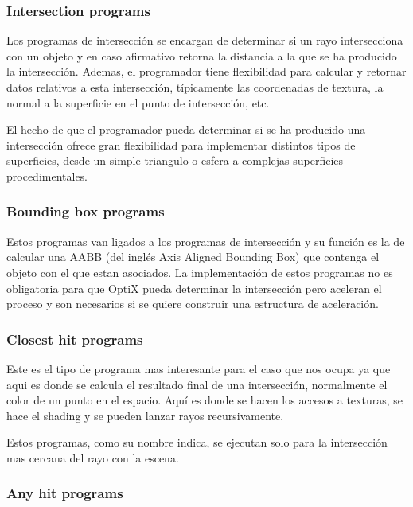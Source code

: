 \subsubsection{Intersection programs}

Los programas de intersección se encargan de determinar si un rayo intersecciona con un objeto y en caso afirmativo retorna la distancia a la que se ha producido la intersección. Ademas, el programador tiene flexibilidad para calcular y retornar datos relativos a esta intersección, típicamente las coordenadas de textura, la normal a la superficie en el punto de intersección, etc.

\medskip

El hecho de que el programador pueda determinar si se ha producido una intersección ofrece gran flexibilidad para implementar distintos tipos de superficies, desde un simple triangulo o esfera a complejas superficies procedimentales.

\subsubsection{Bounding box programs}

Estos programas van ligados a los programas de intersección y su función es la de calcular una AABB (del inglés Axis Aligned Bounding Box) que contenga el objeto con el que estan asociados. La implementación de estos programas no es obligatoria para que OptiX pueda determinar la intersección pero aceleran el proceso y son necesarios si se quiere construir una estructura de aceleración.

\subsubsection{Closest hit programs}

Este es el tipo de programa mas interesante para el caso que nos ocupa ya que aqui es donde se calcula el resultado final de una intersección, normalmente el color de un punto en el espacio. Aquí es donde se hacen los accesos a texturas, se hace el shading y se pueden lanzar rayos recursivamente.

\medskip

Estos programas, como su nombre indica, se ejecutan solo para la intersección mas cercana del rayo con la escena.

\subsubsection{Any hit programs}

